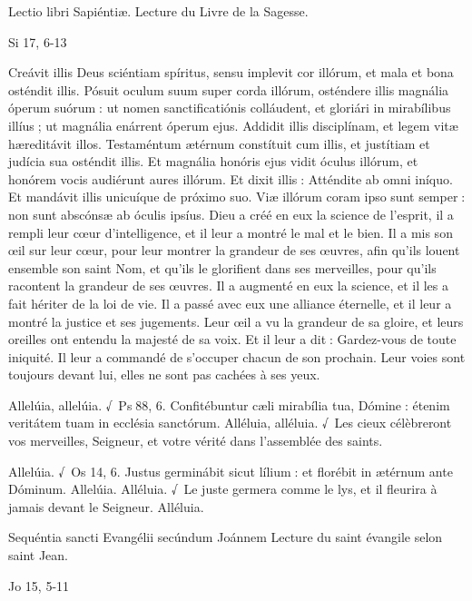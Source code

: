\begin{paracol}{2}
Lectio libri Sapiéntiæ.
\switchcolumn
Lecture du Livre de la Sagesse.
\switchcolumn*

Si 17, 6-13
\switchcolumn

\switchcolumn*

Creávit illis Deus sciéntiam spíritus,  sensu implevit cor illórum, et mala et bona osténdit illis. Pósuit oculum suum super corda illórum, osténdere illis magnália óperum suórum : ut nomen sanctificatiónis colláudent, et gloriári in mirabílibus illíus ; ut magnália enárrent óperum ejus. Addidit illis disciplínam, et legem vitæ hæreditávit illos. Testaméntum ætérnum constítuit cum illis, et justítiam et judícia sua osténdit illis. Et magnália honóris ejus vidit óculus illórum, et honórem vocis audiérunt aures illórum. Et dixit illis : Atténdite ab omni iníquo. Et mandávit illis unicuíque de próximo suo. Viæ illórum coram ipso sunt semper : non sunt abscónsæ ab óculis ipsíus.
\switchcolumn
Dieu a créé en eux la science de l’esprit,  il a rempli leur cœur d’intelligence, et il leur a montré le mal et le bien. Il a mis son œil sur leur cœur, pour leur montrer la grandeur de ses œuvres, afin qu’ils louent ensemble son saint Nom, et qu’ils le glorifient dans ses merveilles, pour qu’ils racontent la grandeur de ses œuvres. Il a augmenté en eux la science, et il les a fait hériter de la loi de vie. Il a passé avec eux une alliance éternelle, et il leur a montré la justice et ses jugements. Leur œil a vu la grandeur de sa gloire, et leurs oreilles ont entendu la majesté de sa voix. Et il leur a dit : Gardez-vous de toute iniquité. Il leur a commandé de s’occuper chacun de son prochain. Leur voies sont toujours devant lui, elles ne sont pas cachées à ses yeux.
\switchcolumn*

Allelúia, allelúia. √~Ps 88, 6. Confitébuntur cæli mirabília tua, Dómine : étenim veritátem tuam in ecclésia sanctórum.
\switchcolumn
Alléluia, alléluia. √~Les cieux célèbreront vos merveilles, Seigneur, et votre vérité dans l’assemblée des saints.
\switchcolumn*

Allelúia. √~Os 14, 6. Justus germinábit sicut lílium : et florébit in ætérnum ante Dóminum. Allelúia.
\switchcolumn
Alléluia. √~Le juste germera comme le lys, et il fleurira à jamais devant le Seigneur. Alléluia.
\switchcolumn*

Sequéntia sancti Evangélii secúndum Joánnem
\switchcolumn
Lecture du saint évangile selon saint Jean.
\switchcolumn*

Jo 15, 5-11
\switchcolumn

\switchcolumn*


\end{paracol}
